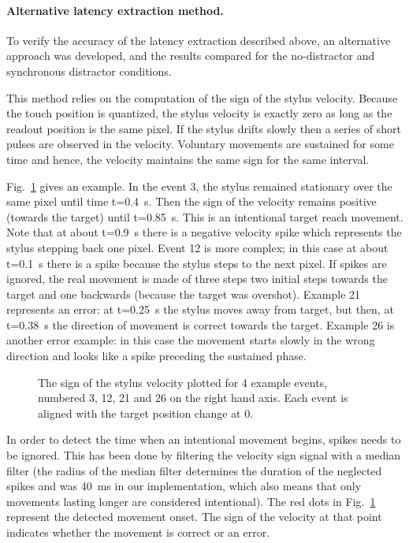 \documentclass[10pt,letterpaper]{article}
\begin{document}
\paragraph{Alternative latency extraction method.}

To verify the accuracy of the latency extraction described above, an
alternative approach was developed, and the results compared for the
no-distractor and synchronous distractor conditions.

This method relies on the computation of the sign of the stylus
velocity. Because the touch position is quantized, the stylus velocity
is exactly zero as long as the readout position is the same pixel. If
the stylus drifts slowly then a series of short pulses are observed in
the velocity. Voluntary movements are sustained for some time and
hence, the velocity maintains the same sign for the same interval.

Fig.~\ref{alt_method_move_dirn} gives an example. In the event 3, the
stylus remained stationary over the same pixel until time
t=0.4~s. Then the sign of the velocity remains positive (towards the
target) until t=0.85~s. This is an intentional target reach
movement. Note that at about t=0.9~s there is a negative velocity spike
which represents the stylus stepping back one pixel. Event 12 is more
complex; in this case at about t=0.1~s there is a spike because the
stylus steps to the next pixel. If spikes are ignored, the real
movement is made of three steps two initial steps towards the target
and one backwards (because the target was overshot). Example 21
represents an error: at t=0.25~s the stylus moves away from target,
but then, at t=0.38~s the direction of movement is correct towards the
target. Example 26 is another error example: in this case the movement
starts slowly in the wrong direction and looks like a spike preceding
the sustained phase.

\begin{figure}[htb!]
\centering
\caption[Alternative method] {The sign of the stylus velocity plotted
  for 4 example events, numbered 3, 12, 21 and 26 on the right hand
  axis. Each event is aligned with the target position change at 0.}
\label{alt_method_move_dirn}
\end{figure}

In order to detect the time when an intentional movement begins,
spikes needs to be ignored. This has been done by filtering the
velocity sign signal with a median filter (the radius of the median
filter determines the duration of the neglected spikes and was 40~ms
in our implementation, which also means that only movements lasting
longer are considered intentional). The red dots in
Fig.~\ref{alt_method_move_dirn} represent the detected movement
onset. The sign of the velocity at that point indicates whether the
movement is correct or an error.
\end{document}
